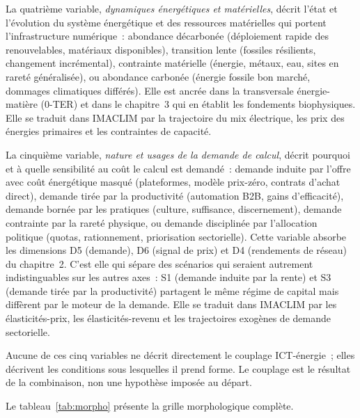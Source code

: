 La quatri\`eme variable, \emph{dynamiques \'energ\'etiques et mat\'erielles}, d\'ecrit l'\'etat et l'\'evolution du syst\`eme \'energ\'etique et des ressources mat\'erielles qui portent l'infrastructure num\'erique~: abondance d\'ecarbon\'ee (d\'eploiement rapide des renouvelables, mat\'eriaux disponibles), transition lente (fossiles r\'esilients, changement incr\'emental), contrainte mat\'erielle (\'energie, m\'etaux, eau, sites en raret\'e g\'en\'eralis\'ee), ou abondance carbon\'ee (\'energie fossile bon march\'e, dommages climatiques diff\'er\'es). Elle est ancr\'ee dans la transversale \'energie-mati\`ere (0-TER) et dans le chapitre~3 qui en \'etablit les fondements biophysiques. Elle se traduit dans IMACLIM par la trajectoire du mix \'electrique, les prix des \'energies primaires et les contraintes de capacit\'e.

La cinqui\`eme variable, \emph{nature et usages de la demande de calcul}, d\'ecrit pourquoi et \`a quelle sensibilit\'e au co\^ut le calcul est demand\'e~: demande induite par l'offre avec co\^ut \'energ\'etique masqu\'e (plateformes, mod\`ele prix-z\'ero, contrats d'achat direct), demande tir\'ee par la productivit\'e (automation B2B, gains d'efficacit\'e), demande born\'ee par les pratiques (culture, suffisance, discernement), demande contrainte par la raret\'e physique, ou demande disciplin\'ee par l'allocation politique (quotas, rationnement, priorisation sectorielle). Cette variable absorbe les dimensions D5 (demande), D6 (signal de prix) et D4 (rendements de r\'eseau) du chapitre~2. C'est elle qui s\'epare des sc\'enarios qui seraient autrement indistinguables sur les autres axes~: S1 (demande induite par la rente) et S3 (demande tir\'ee par la productivit\'e) partagent le m\^eme r\'egime de capital mais diff\`erent par le moteur de la demande. Elle se traduit dans IMACLIM par les \'elasticit\'es-prix, les \'elasticit\'es-revenu et les trajectoires exog\`enes de demande sectorielle.

Aucune de ces cinq variables ne d\'ecrit directement le couplage ICT-\'energie~; elles d\'ecrivent les conditions sous lesquelles il prend forme. Le couplage est le r\'esultat de la combinaison, non une hypoth\`ese impos\'ee au d\'epart.

Le tableau~\ref{tab:morpho} pr\'esente la grille morphologique compl\`ete.

